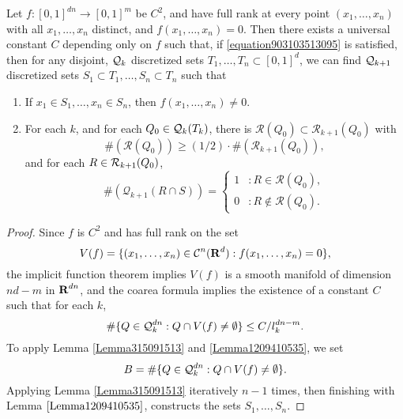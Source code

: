 \begin{corollary} \label{PramanikFraserBuildingBlockLemma}
    Let $f: [0,1]^{dn} \to [0,1]^m$ be $C^2$, and have full rank at every point $(x_1, \dots, x_n)$ with all $x_1, \dots, x_n$ distinct, and $f(x_1, \dots, x_n) = 0$. Then there exists a universal constant $C$ depending only on $f$ such that, if \eqref{equation903103513095} is satisfied, then for any disjoint, $\operatorname{\mathcal{Q}}_k$ discretized sets $T_1, \dots, T_n \subset [0,1]^d$, we can find $\operatorname{\mathcal{Q}}_{k+1}$ discretized sets $S_1 \subset T_1, \dots, S_n \subset T_n$ such that
    \begin{enumerate}
        \item If $x_1 \in S_1, \dots, x_n \in S_n$, then $f(x_1, \dots, x_n) \neq 0$.
        \item For each $k$, and for each $Q_0 \in \operatorname{\mathcal{Q}}_k(T_k)$, there is $\mathcal{R}(Q_0) \subset \mathcal{R}_{k+1}(Q_0)$ with
        \[ \#(\mathcal{R}(Q_0)) \geq (1/2) \cdot \#(\mathcal{R}_{k+1}(Q_0)), \]
        and for each $R \in \operatorname{\mathcal{R}}_{k+1}(Q_0)$,
        \[ \#(\mathcal{Q}_{k+1}(R \cap S)) = \begin{cases} 1 &: R \in \mathcal{R}(Q_0), \\ 0 &: R \not \in \mathcal{R}(Q_0). \end{cases} \]
    \end{enumerate}
\end{corollary}
\begin{proof}
    Since $f$ is $C^2$ and has full rank on the set
    \[ V(f) = \{ (x_1, \dots, x_n) \in \operatorname{\mathcal{C}}^n(\operatorname{\mathbf{R}}^d) : f(x_1, \dots, x_n) = 0 \}, \]
    the implicit function theorem implies $V(f)$ is a smooth manifold of dimension $nd - m$ in $\operatorname{\mathbf{R}}^{dn}$, and the coarea formula implies the existence of a constant $C$ such that for each $k$,
    \[ \# \{ Q \in \operatorname{\mathcal{Q}}_k^{dn} : Q \cap V(f) \neq \emptyset \} \leq C/l_k^{dn-m}. \]
    To apply Lemma \ref{Lemma315091513} and \ref{Lemma1209410535}, we set
    \[ B = \# \{ Q \in \operatorname{\mathcal{Q}}_k^{dn} : Q \cap V(f) \neq \emptyset \}. \]
    Applying Lemma \ref{Lemma315091513} iteratively $n-1$ times, then finishing with Lemma $\ref{Lemma1209410535}$, constructs the sets $S_1, \dots, S_n$.
\end{proof}

